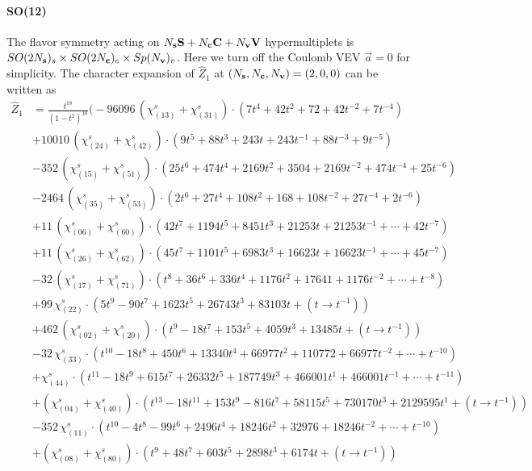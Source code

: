 \documentclass[letterpaper, 11pt]{article}
\newcommand{\nn}{\nonumber}
\begin{document}
{\paragraph{SO(12)} 
The flavor symmetry acting on $N_{\bf s} \mathbf{S} +N_{\bf c} \mathbf{C} + N_{\bf v} \mathbf{V}$ hypermultiplets is $SO(2N_{\bf s})_s \times SO(2N_{\bf c})_c \times  Sp(N_{\bf v})_v$. Here we turn off the Coulomb VEV $\vec{a} = 0$ for simplicity. The character expansion of  $\hat{Z}_1$ at $(N_{\bf s},N_{\bf c}, N_{\bf v}) = (2,0,0)$ can be written as
\begin{align}
  \label{eq:so12-s2}
  \hat{Z}_1&= \frac{t^{18}}{(1-t^2)^{18}}\Big(
  -96096\, (\chi^s_{(13)}+\chi^s_{(31)})\cdot {(7t^4+42t^2+72+42t^{-2}+7t^{-4})}\\
  &+10010\,(\chi^s_{(24)}+\chi^s_{(42)})\cdot {(9t^5+88t^3+243t+243t^{-1}+88t^{-3}+9t^{-5})}\nn\\
  &-352\,(\chi^s_{(15)}+\chi^s_{(51)})\cdot {(25t^6+474t^4+2169t^2+3504+2169t^{-2}+474t^{-4}+25t^{-6})}\nn\\
  &-2464\,(\chi^s_{(35)}+\chi^s_{(53)})\cdot {(2t^6+27t^4+108t^2+168+108t^{-2}+27t^{-4}+2t^{-6})}\nn\\
  &+11\,(\chi^s_{(06)}+\chi^s_{(60)})\cdot {(42t^7+1194t^5+8451t^3+21253t+21253t^{-1}+\cdots+42t^{-7})}\nn\\
  &+11\,(\chi^s_{(26)}+\chi^s_{(62)})\cdot (45t^7+1101t^5+6983t^3+16623t+16623t^{-1} + \cdots + 45t^{-7})\nn\\
  &-32\,(\chi^s_{(17)}+\chi^s_{(71)})\cdot (t^8+36t^6+336t^4+1176t^2+17641+1176t^{-2}+\cdots+t^{-8})\nn\\
  &+99\,\chi^s_{(22)}\cdot {(5t^9-90t^7+1623t^5+26743t^3+83103t+ (t\rightarrow t^{-1}))}\nn\\
  &+462\,(\chi^s_{(02)}+\chi^s_{(20)})\cdot {(t^{9}-18t^7+153t^5+4059t^3+13485t+ (t\rightarrow t^{-1}))}\nn\\
  &-32\,\chi^s_{(33)}\cdot {(t^{10}-18t^8+450t^6+13340t^4+66977t^2+110772+66977t^{-2}+\cdots+t^{-10})}\nn\\
  &+\chi^s_{(44)}\cdot {(t^{11}-18t^9+615t^7+26332t^5+187749t^3+466001t^{1}+466001t^{-1}+\cdots+t^{-11})}\nn\\
  &+(\chi^s_{(04)}+\chi^s_{(40)})\cdot (t^{13}-18t^{11}+153t^9-816t^7+58115t^5+730170t^{3}+2129595t^{1}+(t\rightarrow t^{-1}))\nn\\
  &-352\,\chi^s_{(11)}\cdot{(t^{10}-4t^8-99t^6+2496t^4+18246t^2+32976+18246t^{-2}+\cdots+t^{-10})}\nn\\
  &+(\chi^s_{(08)}+\chi^s_{(80)})\cdot {(t^9+48t^7+603t^5+2898t^3+6174t+(t\rightarrow t^{-1}))}\nn\\

\end{align}}
\end{document}
